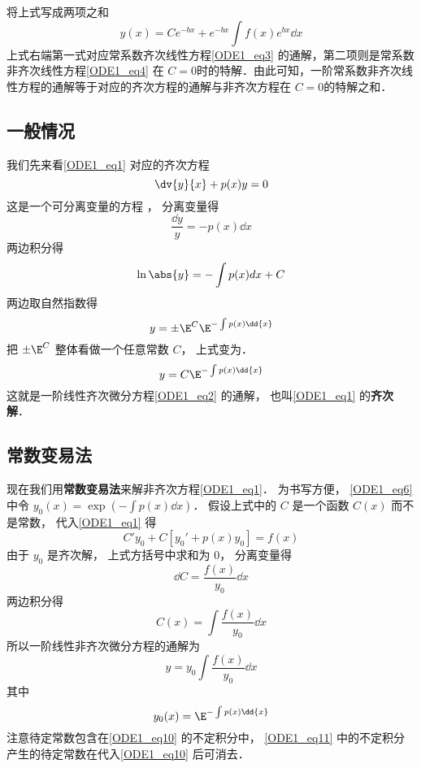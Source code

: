 将上式写成两项之和
\begin{equation}
y(x)=Ce^{-bx}+e^{-bx}\int f(x)e^{bx}\dd x
\end{equation}
上式右端第一式对应常系数齐次线性方程\autoref{ODE1_eq3} 的通解，第二项则是常系数非齐次线性方程\autoref{ODE1_eq4} 在 $C=0$时的特解．由此可知，一阶常系数非齐次线性方程的通解等于对应的齐次方程的通解与非齐次方程在 $C=0$的特解之和．
\subsection{一般情况}
我们先来看\autoref{ODE1_eq1} 对应的齐次方程
\begin{equation}\label{ODE1_eq2}
\dv{y}{x} + p(x)y = 0
\end{equation}
这是一个可分离变量的方程%
， 分离变量得
\begin{equation}
\frac{\dd{y}}{y} = -p(x) \dd{x}
\end{equation}
两边积分得
\begin{equation}
\ln\abs{y} = -\int p(x) dx + C
\end{equation}
两边取自然指数得
\begin{equation}
y = \pm \E^C \E^{-\int p(x) \dd{x}}
\end{equation}
把 $\pm \E^C $ 整体看做一个任意常数 $C$， 上式变为．
\begin{equation}\label{ODE1_eq6}
y = C \E^{-\int p(x) \dd{x}}
\end{equation}
这就是一阶线性齐次微分方程\autoref{ODE1_eq2} 的通解， 也叫\autoref{ODE1_eq1} 的\textbf{齐次解}．

\subsection{常数变易法}

现在我们用\textbf{常数变易法}来解非齐次方程\autoref{ODE1_eq1}． 为书写方便， \autoref{ODE1_eq6} 中令 $y_0(x) = \exp(-\int p(x) \dd{x})$． 假设上式中的 $C$ 是一个函数 $C(x)$ 而不是常数， 代入\autoref{ODE1_eq1} 得
\begin{equation}
C'y_0 + C[y_0' + p(x)y_0] = f(x)
\end{equation}
由于 $y_0$ 是齐次解， 上式方括号中求和为 0， 分离变量得
\begin{equation}
\dd{C}= \frac{f(x)}{y_0} \dd{x}
\end{equation}
两边积分得
\begin{equation}
C(x) = \int \frac{f(x)}{y_0} \dd{x}
\end{equation}
所以一阶线性非齐次微分方程的通解为
\begin{equation}\label{ODE1_eq10}
y = y_0  \int \frac{f(x)}{y_0} \dd{x}
\end{equation}
其中
\begin{equation}\label{ODE1_eq11}
y_0(x) = \E^{-\int p(x) \dd{x}}
\end{equation}
注意待定常数包含在\autoref{ODE1_eq10} 的不定积分中， \autoref{ODE1_eq11} 中的不定积分产生的待定常数在代入\autoref{ODE1_eq10} 后可消去．
